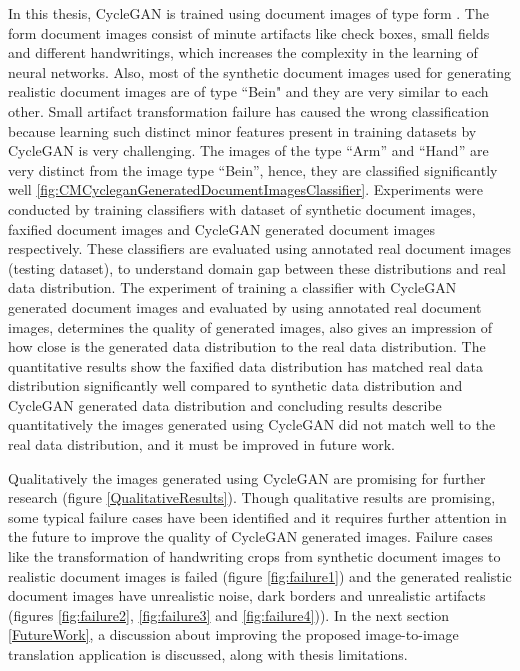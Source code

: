 In this thesis, \ac{CycleGAN} is trained using document images of type form . The form document images consist of minute artifacts like check boxes, small fields and different handwritings, which increases the complexity in the learning of neural networks. Also, most of the synthetic document images used for generating realistic document images are of type ``Bein" and they are very similar to each other. Small artifact transformation failure has caused the wrong classification because learning such distinct minor features present in training datasets by \ac{CycleGAN} is very challenging. The images of the type ``Arm'' and ``Hand'' are very distinct from the image type ``Bein'', hence, they are classified significantly well \ref{fig:CMCycleganGeneratedDocumentImagesClassifier}. Experiments were conducted by training classifiers with dataset of synthetic document images, faxified document images and \ac{CycleGAN} generated document images respectively. These classifiers are evaluated using annotated real document images (testing dataset), to understand domain gap between these distributions and real data distribution. The experiment of training a classifier with \ac{CycleGAN} generated document images and evaluated by using annotated real document images, determines the quality of generated images, also gives an impression of how close is the generated data distribution to the real data distribution. The quantitative results show the faxified data distribution has matched real data distribution significantly well compared to synthetic data distribution and \ac{CycleGAN} generated data distribution and concluding results describe quantitatively the images generated using \ac{CycleGAN} did not match well to the real data distribution, and it must be improved in future work.

Qualitatively the images generated using \ac{CycleGAN} are promising for further research (figure \ref{QualitativeResults}). Though qualitative results are promising, some typical failure cases have been identified and it requires further attention in the future to improve the quality of \ac{CycleGAN} generated images. Failure cases like the transformation of handwriting crops from synthetic document images to realistic document images is failed (figure \ref{fig:failure1}) and the generated realistic document images have unrealistic noise, dark borders and unrealistic artifacts (figures \ref{fig:failure2}, \ref{fig:failure3} and \ref{fig:failure4})). In the next section \ref{FutureWork}, a discussion about improving the proposed image-to-image translation application is discussed, along with thesis limitations.

